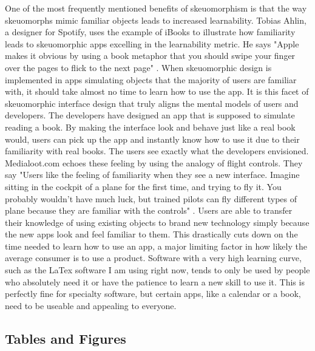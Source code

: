 \documentclass{article}
\begin{document}
One of the most frequently mentioned benefits of skeuomorphism is that the way skeuomorphs mimic familiar objects leads to increased learnability. Tobias Ahlin, a designer for Spotify, uses the example of iBooks to illustrate how familiarity leads to skeuomorphic apps excelling in the learnability metric. He says "Apple makes it obvious by using a book metaphor that you should swipe your finger over the pages to flick to the next page" \cite{story}. When skeuomorphic design is implemented in apps simulating objects that the majority of users are familiar with, it should take almost no time to learn how to use the app. It is this facet of skeuomorphic interface design that truly aligns the mental models of users and developers. The developers have designed an app that is supposed to simulate reading a book. By making the interface look and behave just like a real book would, users can pick up the app and instantly know how to use it due to their familiarity with real books. The users see exactly what the developers envisioned. Medialoot.com echoes these feeling by using the analogy of flight controls. They say "Users like the feeling of familiarity when they see a new interface. Imagine sitting in the cockpit of a plane for the first time, and trying to fly it. You probably wouldn't have much luck, but trained pilots can fly different types of plane because they are familiar with the controls" \cite{media loot}. Users are able to transfer their knowledge of using existing objects to brand new technology simply because the new apps look and feel familiar to them. This drastically cuts down on the time needed to learn how to use an app, a major limiting factor in how likely the average consumer is to use a product. Software with a very high learning curve, such as the LaTex software I am using right now, tends to only be used by people who absolutely need it or have the patience to learn a new skill to use it. This is perfectly fine for specialty software, but certain apps, like a calendar or a book, need to be useable and appealing to everyone.


\subsection{Tables and Figures}
\end{document}
